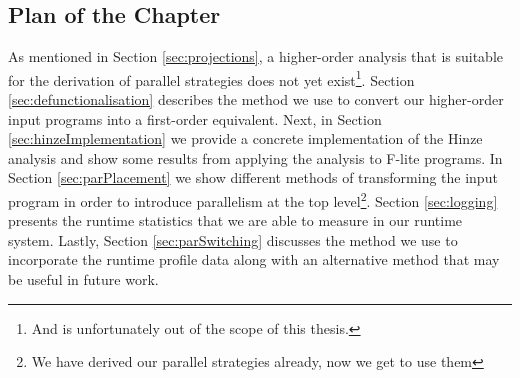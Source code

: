 \subsection*{Plan of the Chapter}

As mentioned in Section \ref{sec:projections}, a higher-order analysis that is
suitable for the derivation of parallel strategies does not yet exist\footnote{
And is unfortunately out of the scope of this thesis.}. Section
\ref{sec:defunctionalisation} describes the method we use to convert our
higher-order input programs into a first-order equivalent. Next, in Section
\ref{sec:hinzeImplementation} we provide a concrete implementation of the Hinze
analysis and show some results from applying the analysis to F-lite programs.
In Section \ref{sec:parPlacement} we show different methods of transforming the
input program in order to introduce parallelism at the top level\footnote{We
have derived our parallel strategies already, now we get to use them}. Section
\ref{sec:logging} presents the runtime statistics that we are able to measure
in our runtime system. Lastly, Section \ref{sec:parSwitching} discusses the
method we use to incorporate the runtime profile data along with an alternative
method that may be useful in future work. 
